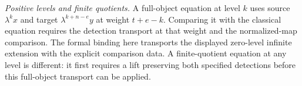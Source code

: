 \begin{proposition}
\textit{Positive levels and finite quotients.}
A full-object equation at level $k$ uses source $\lambda^kx$
and target $\lambda^{k+n-e}y$ at weight $t+e-k$.
Comparing it with the classical equation requires the detection
transport at that weight and the normalized-map comparison.
The formal binding here transports the displayed zero-level
infinite extension with the explicit comparison data.
A finite-quotient equation at any level is different: it first
requires a lift preserving both specified detections before this
full-object transport can be applied.
\end{proposition}
